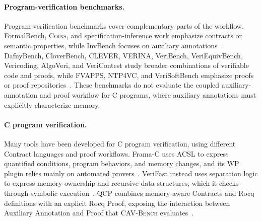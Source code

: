 \paragraph{Program-verification benchmarks.}
Program-verification benchmarks cover complementary parts of the workflow. FormalBench, \textsc{Coins}, and specification-inference work emphasize contracts or semantic properties, while InvBench focuses on auxiliary annotations~\cite{cosler2023nl2spec,autospec,ma2025specgen,lecong2025formalbench,yang2026coins,wei2025invbench}. DafnyBench, CloverBench, CLEVER, VERINA, VeriBench, VeriEquivBench, Vericoding, AlgoVeri, and VeriContest study broader combinations of verifiable code and proofs, while FVAPPS, NTP4VC, and VeriSoftBench emphasize proofs or proof repositories~\cite{loughridge2024dafnybench,sun2024clover,thakur2025clever,ye2026verina,miranda2026veribench,zeng2026veriequivbench,bursuc2025vericoding,zhao2026algoveri,xie2026vericontest,dougherty2025proving,xu2026neural,xin2026verisoftbench}. These benchmarks do not evaluate the coupled auxiliary-annotation and proof workflow for C programs, where auxiliary annotations must explicitly characterize memory.

\paragraph{C program verification.}
Many tools have been developed for C program verification, using different Contract languages and proof workflows. Frama-C uses ACSL to express quantified conditions, program behaviors, and memory changes, and its WP plugin relies mainly on automated provers~\cite{kirchner2015framac}. VeriFast instead uses separation logic to express memory ownership and recursive data structures, which it checks through symbolic execution~\cite{jacobs2011verifast}. QCP combines memory-aware Contracts and Rocq definitions with an explicit Rocq Proof, exposing the interaction between Auxiliary Annotation and Proof that \textsc{CAV-Bench} evaluates~\cite{wu2025qcppracticalseparationlogicbased}.



